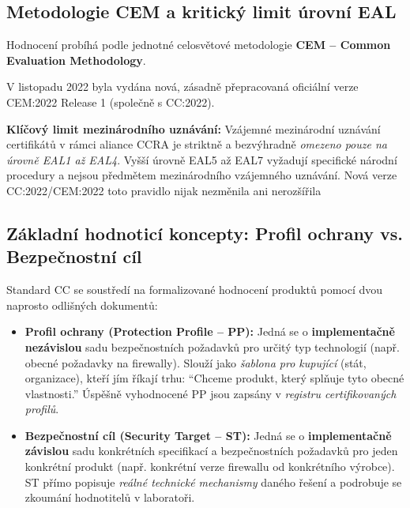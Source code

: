 \documentclass[10pt,a4paper]{article}
\begin{document}
	\subsection{Metodologie CEM a kritický limit úrovní EAL}
	Hodnocení probíhá podle jednotné celosvětové metodologie \textbf{CEM -- Common Evaluation Methodology}.
	
	V listopadu 2022 byla vydána nová, zásadně přepracovaná oficiální verze CEM:2022 Release 1 (společně s CC:2022).
	
	\textbf{Klíčový limit mezinárodního uznávání:} Vzájemné mezinárodní uznávání certifikátů v rámci aliance CCRA je striktně a bezvýhradně \textit{omezeno pouze na úrovně EAL1 až EAL4}.
	Vyšší úrovně EAL5 až EAL7 vyžadují specifické národní procedury a nejsou předmětem mezinárodního vzájemného uznávání. Nová verze CC:2022/CEM:2022 toto pravidlo nijak nezměnila ani nerozšířila
	
	\subsection{Základní hodnoticí koncepty: Profil ochrany vs. Bezpečnostní cíl}
	Standard CC se soustředí na formalizované hodnocení produktů pomocí dvou naprosto odlišných dokumentů:
	
	\begin{itemize}
		\item \textbf{Profil ochrany (Protection Profile -- PP):} 
		Jedná se o \textbf{implementačně nezávislou} sadu bezpečnostních požadavků pro určitý typ technologií (např. obecné požadavky na firewally). 
		Slouží jako \textit{šablona pro kupující} (stát, organizace), kteří jím říkají trhu: ``Chceme produkt, který splňuje tyto obecné vlastnosti.'' Úspěšně vyhodnocené PP jsou zapsány v \textit{registru certifikovaných profilů}.
	
		\item \textbf{Bezpečnostní cíl (Security Target -- ST):} 
		Jedná se o \textbf{implementačně závislou} sadu konkrétních specifikací a bezpečnostních požadavků pro jeden konkrétní produkt (např. konkrétní verze firewallu od konkrétního výrobce). 
		ST přímo popisuje \textit{reálné technické mechanismy} daného řešení a podrobuje se zkoumání hodnotitelů v laboratoři.
	\end{itemize}
		
\end{document}
